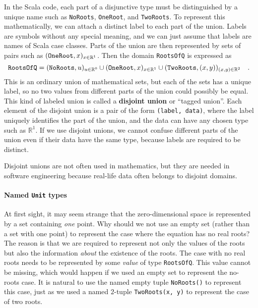 In the Scala code, each part of a disjunctive type must be distinguished
by a unique name such as \lstinline!NoRoots!, \lstinline!OneRoot!,
and \lstinline!TwoRoots!. To represent this mathematically, we can
attach a distinct label to each part of the union. Labels are symbols
without any special meaning, and we can just assume that labels are
names of Scala case classes. Parts of the union are then represented
by sets of pairs such as $(\text{\texttt{OneRoot}},x)_{x\in\mathbb{R}^{1}}$.
Then the domain \lstinline!RootsOfQ! is expressed as
\[
\text{\texttt{RootsOfQ}}=(\text{\texttt{NoRoots}},u)_{u\in\mathbb{R}^{0}}\cup(\text{\texttt{OneRoot}},x)_{x\in\mathbb{R}^{1}}\cup(\text{\texttt{TwoRoots}},\left(x,y\right))_{\left(x,y\right)\in\mathbb{R}^{2}}\quad.
\]
This is an ordinary union of mathematical sets, but each of the sets
has a unique label, so no two values from different parts of the union
could possibly be equal. This kind of labeled union is called a \textbf{disjoint
union} or ``tagged union''. Each element of the disjoint union is
a pair of the form \lstinline!(label, data)!, where the label uniquely
identifies the part of the union, and the data can have any chosen
type such as $\mathbb{R}^{1}$. If we use disjoint unions, we cannot
confuse different parts of the union even if their data have the same
type, because labels are required to be distinct.

Disjoint unions are not often used in mathematics, but they are needed
in software engineering because real-life data often belongs to disjoint
domains.

\paragraph{Named \texttt{Unit} types}

At first sight, it may seem strange that the zero-dimensional space
is represented by a set containing \emph{one} point. Why should we
not use an empty set (rather than a set with one point) to represent
the case where the equation has no real roots? The reason is that
we are required to represent not only the values of the roots but
also the information \emph{about} the existence of the roots. The
case with no real roots needs to be represented by some \emph{value}
of type \lstinline!RootsOfQ!. This value cannot be missing, which
would happen if we used an empty set to represent the no-roots case.
It is natural to use the named empty tuple \lstinline!NoRoots()!
to represent this case, just as we used a named $2$-tuple \lstinline!TwoRoots(x, y)!
to represent the case of two roots.

